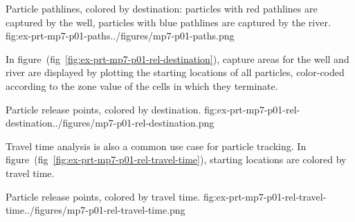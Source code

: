 \begin{StandardFigure}{
    Particle pathlines, colored by destination: particles with red pathlines are captured by the well, particles with blue pathlines are captured by the river.
    }{fig:ex-prt-mp7-p01-paths}{../figures/mp7-p01-paths.png}
\end{StandardFigure}

In figure~(fig~\ref{fig:ex-prt-mp7-p01-rel-destination}), capture areas for the well and river are displayed by plotting the starting locations of all particles, color-coded according to the zone value of the cells in which they terminate.

\begin{StandardFigure}{
    Particle release points, colored by destination.
    }{fig:ex-prt-mp7-p01-rel-destination}{../figures/mp7-p01-rel-destination.png}
\end{StandardFigure}

Travel time analysis is also a common use case for particle tracking. In figure~(fig~\ref{fig:ex-prt-mp7-p01-rel-travel-time}), starting locations are colored by travel time.

\begin{StandardFigure}{
    Particle release points, colored by travel time.
    }{fig:ex-prt-mp7-p01-rel-travel-time}{../figures/mp7-p01-rel-travel-time.png}
\end{StandardFigure}